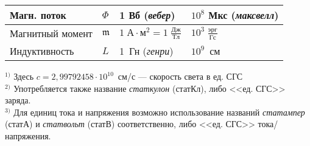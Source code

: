 \begin{table}
\begin{tabular}{m{29mm}m{11mm}m{26mm}m{35mm}}
        Магн. поток  & $\Phi$ & 1 Вб (\emph{вебер}) 
                     & $10^8$ Мкс (\emph{максвелл})                    \bigstrut\\ \hline
        Магнитный момент    & $\mathfrak{m}$ & $1\;А\cdot м^2 = 1\;\frac{Дж}{Тл}$ 
                        & $10^3\;\frac{эрг}{Гс}$                       \bigstrut\\ \hline
        Индуктивность & $L$ & 1~Гн (\emph{генри})
                      & $10^9$~см                                      \bigstrut\\
\bottomrule[1pt]
    \end{tabular}
    \endgroup
    \vspace*{-0.7\baselineskip}
    \flushleft
    \noindent\footnotesize{}$^{1)}$ Здесь $c = 2,99792458\cdot 10^{10}$~см/с --- скорость света в ед. СГС\\
    $^{2)}$ Употребляется также название \emph{статкулон} (статКл),
    либо <<ед. СГС>> заряда. \\
    $^{3)}$ Для единиц тока и напряжения возможно использование
    названий \emph{статампер} (статА) и \emph{статвольт} (статВ) соответственно,
    либо <<ед. СГС>> тока/напряжения.
\end{table}

\newpage


